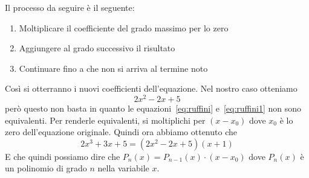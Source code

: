 Il processo da seguire è il seguente:
\begin{enumerate}
	\item Moltiplicare il coefficiente del grado massimo per lo zero
	\item Aggiungere al grado successivo il risultato
	\item Continuare fino a che non si arriva al termine noto
\end{enumerate}
Così si otterranno i nuovi coefficienti dell'equazione. Nel nostro caso otteniamo
\begin{equation}\label{eq:ruffini1}
2x^2 -2x + 5
\end{equation}
però questo non basta in quanto le equazioni~\eqref{eq:ruffini} e~\eqref{eq:ruffini1} non sono 
equivalenti. Per renderle equivalenti, si moltiplichi per $(x-x_0)$ dove $x_0$ è lo zero dell'equazione
originale. Quindi ora abbiamo ottenuto che
\begin{equation*}
2x^3 + 3x + 5 = (2x^2 -2x + 5)(x+1)
\end{equation*}
E che quindi possiamo dire che $P_n(x) = P_{n-1}(x)\cdot(x-x_0)$ dove $P_n(x)$ è un polinomio di grado
$n$ nella variabile $x$.

\setcounter{equation}{0}

